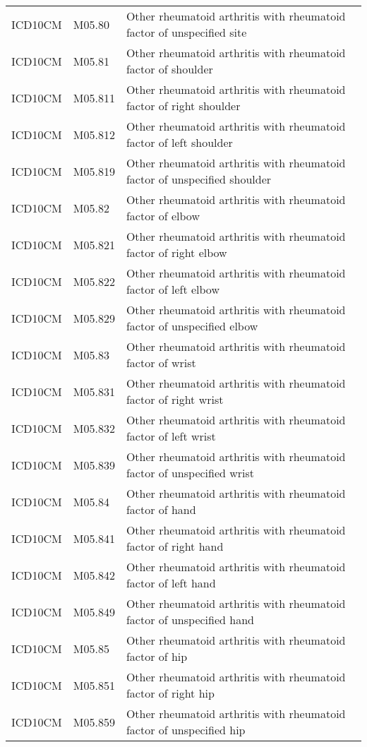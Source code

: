 \begin{table}[ht]
\begin{tabular}{lll}
  ICD10CM & M05.80 & Other rheumatoid arthritis with rheumatoid factor of unspecified site \\ 
  ICD10CM & M05.81 & Other rheumatoid arthritis with rheumatoid factor of shoulder \\ 
  ICD10CM & M05.811 & Other rheumatoid arthritis with rheumatoid factor of right shoulder \\ 
  ICD10CM & M05.812 & Other rheumatoid arthritis with rheumatoid factor of left shoulder \\ 
  ICD10CM & M05.819 & Other rheumatoid arthritis with rheumatoid factor of unspecified shoulder \\ 
  ICD10CM & M05.82 & Other rheumatoid arthritis with rheumatoid factor of elbow \\ 
  ICD10CM & M05.821 & Other rheumatoid arthritis with rheumatoid factor of right elbow \\ 
  ICD10CM & M05.822 & Other rheumatoid arthritis with rheumatoid factor of left elbow \\ 
  ICD10CM & M05.829 & Other rheumatoid arthritis with rheumatoid factor of unspecified elbow \\ 
  ICD10CM & M05.83 & Other rheumatoid arthritis with rheumatoid factor of wrist \\ 
  ICD10CM & M05.831 & Other rheumatoid arthritis with rheumatoid factor of right wrist \\ 
  ICD10CM & M05.832 & Other rheumatoid arthritis with rheumatoid factor of left wrist \\ 
  ICD10CM & M05.839 & Other rheumatoid arthritis with rheumatoid factor of unspecified wrist \\ 
  ICD10CM & M05.84 & Other rheumatoid arthritis with rheumatoid factor of hand \\ 
  ICD10CM & M05.841 & Other rheumatoid arthritis with rheumatoid factor of right hand \\ 
  ICD10CM & M05.842 & Other rheumatoid arthritis with rheumatoid factor of left hand \\ 
  ICD10CM & M05.849 & Other rheumatoid arthritis with rheumatoid factor of unspecified hand \\ 
  ICD10CM & M05.85 & Other rheumatoid arthritis with rheumatoid factor of hip \\ 
  ICD10CM & M05.851 & Other rheumatoid arthritis with rheumatoid factor of right hip \\ 
  ICD10CM & M05.859 & Other rheumatoid arthritis with rheumatoid factor of unspecified hip \\ 

\end{tabular}
\end{table}

